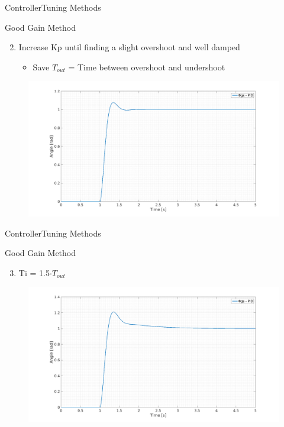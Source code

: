 \begin{frame}{Controller}{Tuning Methods}
  \begin{block}{Good Gain Method}
  
	  \begin{enumerate}
	  \setcounter{enumi}{1}
	  	\item Increase Kp until finding a slight overshoot and well damped
	  	\begin{itemize}
	  	\item Save $T_{out}$ = Time between overshoot and undershoot
	  	\end{itemize}
	  \end{enumerate}
	  \begin{figure}
       \includegraphics[scale=0.18]{../report/figures/GG2.png}
      \end{figure}
  
  \end{block}
\end{frame}

\begin{frame}{Controller}{Tuning Methods}
  \begin{block}{Good Gain Method}
  
	  \begin{enumerate}
	  \setcounter{enumi}{2}
	  	\item Ti = 1.5$\cdot T_{out}$
	  \end{enumerate}
	  \begin{figure}
       \includegraphics[scale=0.20]{../report/figures/GG3.png}
      \end{figure}
  
  \end{block}
\end{frame}



